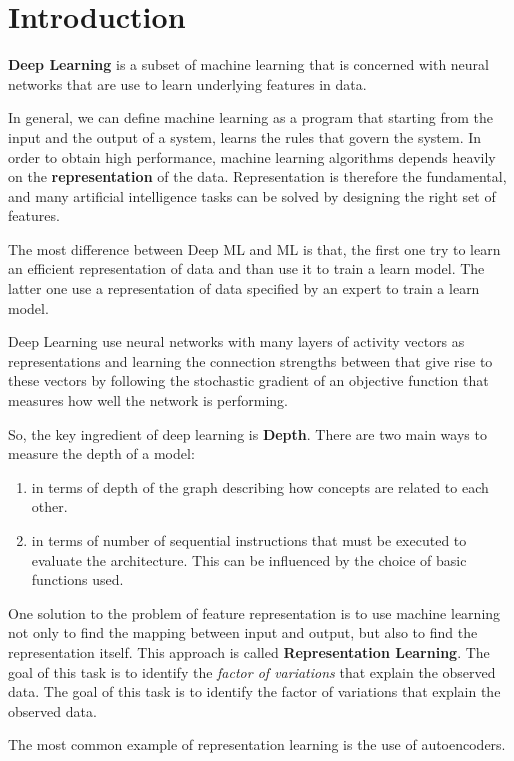 \chapter*{Introduction}
\textbf{Deep Learning} is a subset of machine learning that is concerned with 
neural networks that are use to learn underlying features in data.

In general, we can define machine learning as a program that starting from the 
input and the output of a system, learns the rules that govern the system. In 
order to obtain high performance, machine learning algorithms depends heavily on 
the \textbf{representation} of the data. Representation is therefore the fundamental, 
and many artificial intelligence tasks can be solved by designing the right set of features.

The most difference between Deep ML and ML is that, the first one try to learn an
efficient representation of data and than use it to train a learn model. The latter 
one use a representation of data specified by an expert to train a learn model.

Deep Learning use neural networks with many layers of activity vectors as 
representations and learning the connection strengths between that give rise to 
these vectors by following the stochastic gradient of an objective function that
measures how well the network is performing.

So, the key ingredient of deep learning is \textbf{Depth}. There are two main 
ways to measure the depth of a model:
\begin{enumerate}
    \item in terms of depth of the graph describing how concepts are related to
        each other.
    \item in terms of number of sequential instructions that must be executed to 
        evaluate the architecture. This can be influenced by the choice of basic 
        functions used.
\end{enumerate}

One solution to the problem of feature representation is to use machine learning
not only to find the mapping between input and output, but also to find the
representation itself. This approach is called \textbf{Representation Learning}.
The goal of this task is to identify the \textit{factor of variations} that 
explain the observed data. The goal of this task is to identify the factor of 
variations that explain the observed data.

The most common example of representation learning is the use of autoencoders.

